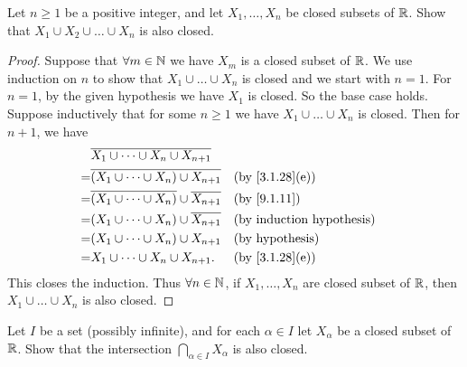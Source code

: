\begin{ex}\label{ex:9.1.7}
	Let \(n \geq 1\) be a positive integer, and let \(X_1, \dots, X_n\) be closed subsets of \(\mathbb{R}\).
	Show that \(X_1 \cup X_2 \cup \dots \cup X_n\) is also closed.
\end{ex}

\begin{proof}
	Suppose that \(\forall m \in \mathbb{N}\) we have \(X_m\) is a closed subset of \(\mathbb{R}\).
	We use induction on \(n\) to show that \(X_1 \cup \dots \cup X_n\) is closed and we start with \(n = 1\).
	For \(n = 1\), by the given hypothesis we have \(X_1\) is closed.
	So the base case holds.
	Suppose inductively that for some \(n \geq 1\) we have \(X_1 \cup \dots \cup X_n\) is closed.
	Then for \(n + 1\), we have
	\begin{align*}
		  & \overline{X_1 \cup \dots \cup X_n \cup X_{n + 1}}                                                \\
		= & \overline{(X_1 \cup \dots \cup X_n) \cup X_{n + 1}}            &  & \text{(by \cref{3.1.28}(e))} \\
		= & \overline{(X_1 \cup \dots \cup X_n)} \cup \overline{X_{n + 1}} &  & \by{9.1.11}                  \\
		= & (X_1 \cup \dots \cup X_n) \cup \overline{X_{n + 1}}            &  & \byIH                        \\
		= & (X_1 \cup \dots \cup X_n) \cup X_{n + 1}                       &  & \text{(by hypothesis)}       \\
		= & X_1 \cup \dots \cup X_n \cup X_{n + 1}.                        &  & \text{(by \cref{3.1.28}(e))}
	\end{align*}
	This closes the induction.
	Thus \(\forall n \in \mathbb{N}\), if \(X_1, \dots, X_n\) are closed subset of \(\mathbb{R}\), then \(X_1 \cup \dots \cup X_n\) is also closed.
\end{proof}

\begin{ex}\label{ex:9.1.8}
	Let \(I\) be a set (possibly infinite), and for each \(\alpha \in I\) let \(X_{\alpha}\) be a closed subset of \(\mathbb{R}\).
	Show that the intersection \(\bigcap_{\alpha \in I} X_{\alpha}\) is also closed.
\end{ex}

